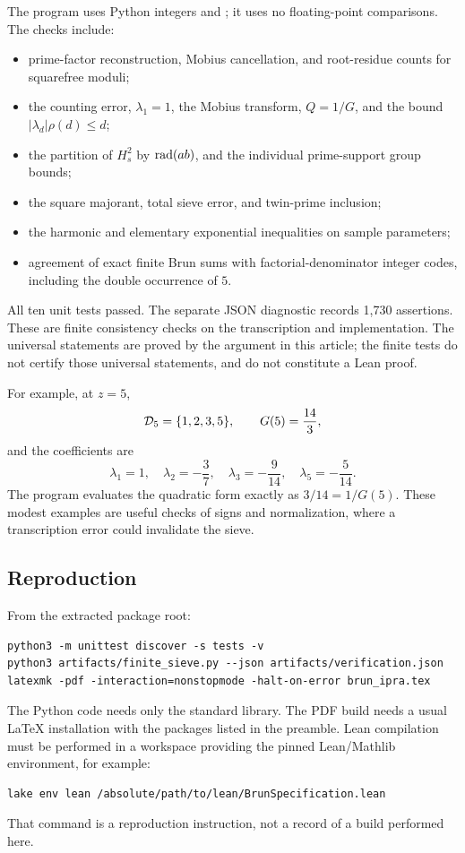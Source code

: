 The program uses Python integers and ; it uses no
floating-point comparisons. The checks include:
\begin{itemize}
\item prime-factor reconstruction, Mobius cancellation, and root-residue
counts for squarefree moduli;
\item the counting error, \(\lambda_1=1\), the Mobius transform,
\(Q=1/G\), and the bound \(|\lambda_d|\rho(d)\le d\);
\item the partition of \(H_s^2\) by \(\operatorname{rad}(ab)\), and the individual
prime-support group bounds;
\item the square majorant, total sieve error, and twin-prime inclusion;
\item the harmonic and elementary exponential inequalities on sample
parameters;
\item agreement of exact finite Brun sums with factorial-denominator
integer codes, including the double occurrence of \(5\).
\end{itemize}

All ten unit tests passed. The separate JSON diagnostic records 1,730
assertions. These are finite consistency checks on the transcription and
implementation. The universal statements are proved by the argument in
this article; the finite tests do not certify those universal statements,
and do not constitute a Lean proof.

For example, at \(z=5\),
\[
 \mathcal D_5=\{1,2,3,5\},\qquad G(5)=\frac{14}{3},
\]
and the coefficients are
\[
 \lambda_1=1,\quad
 \lambda_2=-\frac37,\quad
 \lambda_3=-\frac9{14},\quad
 \lambda_5=-\frac5{14}.
\]
The program evaluates the quadratic form exactly as \(3/14=1/G(5)\).
These modest examples are useful checks of signs and normalization,
where a transcription error could invalidate the sieve.

\subsection{Reproduction}

From the extracted package root:
\begin{lstlisting}
python3 -m unittest discover -s tests -v
python3 artifacts/finite_sieve.py --json artifacts/verification.json
latexmk -pdf -interaction=nonstopmode -halt-on-error brun_ipra.tex
\end{lstlisting}
The Python code needs only the standard library.
The PDF build needs a usual LaTeX installation with the packages listed
in the preamble.
Lean compilation must be performed in a workspace providing the pinned
Lean/Mathlib environment, for example:
\begin{lstlisting}
lake env lean /absolute/path/to/lean/BrunSpecification.lean
\end{lstlisting}
That command is a reproduction instruction, not a record of a build
performed here.

